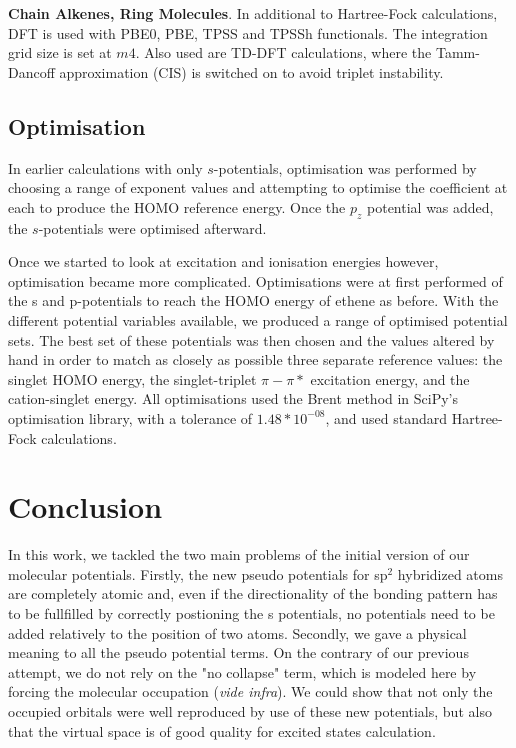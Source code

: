 \documentclass[journal=jctcce,manuscript=article]{achemso}
\begin{document}
\textbf{Chain Alkenes, Ring Molecules}. In additional to Hartree-Fock calculations, DFT is used with PBE0, PBE, TPSS and TPSSh functionals. \cite{pbe0,pbe,tpss,tpssh} The integration grid size is set at \(m4\). Also used are TD-DFT calculations, where the Tamm-Dancoff approximation (CIS) \cite{tammdancoff} is switched on to avoid triplet instability.

\subsection{Optimisation}

In earlier calculations with only \(s\)-potentials, optimisation was performed by choosing a range of exponent values and attempting to optimise the coefficient at each to produce the HOMO reference energy. Once the \(p_{z}\) potential was added, the \(s\)-potentials were optimised afterward. 

Once we started to look at excitation and ionisation energies however, optimisation became more complicated. Optimisations were at first performed of the s and p-potentials to reach the HOMO energy of ethene as before. With the different potential variables available, we produced a range of optimised potential sets. The best set of these potentials was then chosen and the values altered by hand in order to match as closely as possible three separate reference values: the singlet HOMO energy, the singlet-triplet \(\pi-\pi*\) excitation energy, and the cation-singlet energy. All optimisations used the Brent method in SciPy's optimisation library, with a tolerance of \(1.48*10^{-08}\), and used standard Hartree-Fock calculations.\cite{scipy}

\section{Conclusion}
In this work, we tackled the two main problems of the initial version of our
molecular potentials.
Firstly, the new pseudo potentials for sp$^2$ hybridized
atoms are completely atomic and, even if the directionality of the bonding pattern
has to be fullfilled by correctly postioning the s potentials, no potentials need to
be added relatively to the position of two atoms.
Secondly, we gave a physical meaning to all the pseudo potential
terms.
On the contrary of our previous attempt, we do not rely on the "no collapse" term,
which is modeled here by forcing the molecular occupation (\emph{vide infra}).
We could show that not only the occupied orbitals were well reproduced
by use of these new potentials, but also that the virtual space is of good quality
for excited states calculation.
\end{document}
